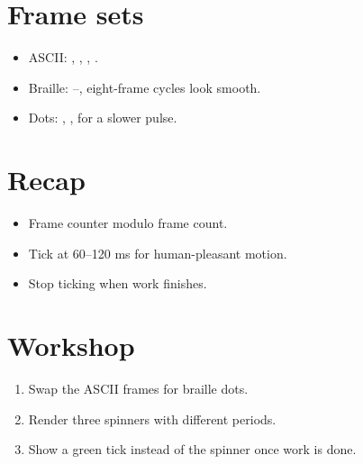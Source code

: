\section{Frame sets}

\begin{itemize}[leftmargin=*]
  \item ASCII: \code{|}, \code{/}, \code{-}, \code{\textbackslash}.
  \item Braille: --, eight-frame
    cycles look smooth.
  \item Dots: , ,  for a slower
    pulse.
\end{itemize}

\section{Recap}

\begin{recap}
\begin{itemize}[leftmargin=*]
  \item Frame counter modulo frame count.
  \item Tick at 60--120 ms for human-pleasant motion.
  \item Stop ticking when work finishes.
\end{itemize}
\end{recap}

\section*{Workshop}

\begin{enumerate}[leftmargin=*]
  \item Swap the ASCII frames for braille dots.
  \item Render three spinners with different periods.
  \item Show a green tick instead of the spinner once work
    is done.
\end{enumerate}
